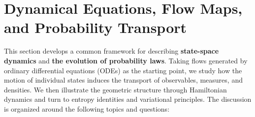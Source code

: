 \documentclass[12pt,a4paper,oneside]{book}
\begin{document}
\section{Dynamical Equations, Flow Maps, and Probability Transport}
\label{sec:flows-transport}

This section develops a common framework for describing \textbf{state-space dynamics} and \textbf{the evolution of probability
laws}. Taking flows generated by ordinary differential equations (ODEs) as the starting point, we study how the motion of
individual states induces the transport of observables, measures, and densities. We then illustrate the geometric structure
through Hamiltonian dynamics and turn to entropy identities and variational principles. The discussion is organized around
the following topics and questions:
\end{document}

